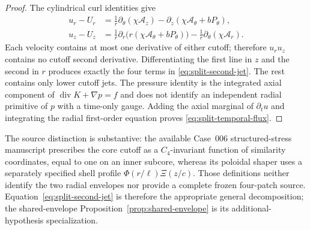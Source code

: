 \documentclass[11pt,a4paper]{article}
\theoremstyle{plain}
\theoremstyle{definition}
\begin{document}
\begin{proof}
The cylindrical curl identities give
\[
\begin{aligned}
 u_r-U_r&=\frac1r\partial_\theta(\chi\mathcal A_z)
              -\partial_z(\chi\mathcal A_\theta+bP_\theta),\\
 u_z-U_z&=\frac1r\partial_r
                \bigl(r(\chi\mathcal A_\theta+bP_\theta)\bigr)
              -\frac1r\partial_\theta(\chi\mathcal A_r).
\end{aligned}
\]
Each velocity contains at most one derivative of either cutoff;
therefore $u_ru_z$ contains no cutoff second derivative.
Differentiating the first line in $z$ and the second in $r$
produces exactly the four terms in \eqref{eq:split-second-jet}.
The rest contains only lower cutoff jets. The pressure identity
is the integrated axial component of
$\operatorname{div}K+\nabla p=f$ and does not identify an
independent radial primitive of $p$ with a time-only gauge.
Adding the axial marginal of $\partial_tu$ and integrating the
radial first-order equation proves \eqref{eq:split-temporal-flux}.
\end{proof}

The source distinction is substantive: the available Case~006
structured-stress manuscript prescribes the core cutoff as a
$C_4$-invariant function of similarity coordinates, equal to one
on an inner subcore, whereas its poloidal shaper uses a separately
specified shell profile $\Phi(r/\ell)\Xi(z/c)$. Those definitions
neither identify the two radial envelopes nor provide a complete
frozen four-patch source. Equation~\eqref{eq:split-second-jet}
is therefore the appropriate general decomposition; the
shared-envelope Proposition~\ref{prop:shared-envelope} is its
additional-hypothesis specialization.
\end{document}
